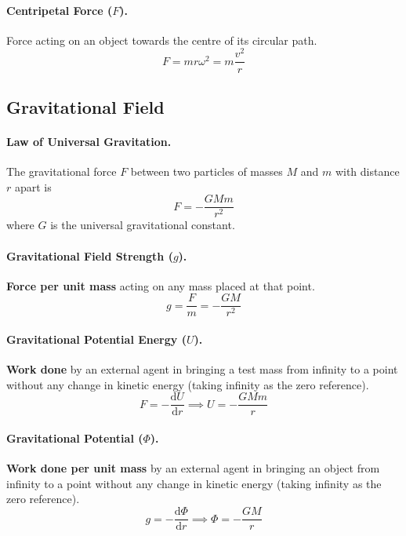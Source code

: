 \documentclass{article}
\begin{document}
\paragraph{Centripetal Force ($F$).} Force acting on an object towards the centre of its circular path. \begin{equation}
F = mr\omega^2 = m\frac{v^2}{r}
\end{equation}

\subsection{Gravitational Field}

\paragraph{Law of Universal Gravitation.} The gravitational force $F$ between two particles of masses $M$ and $m$ with distance $r$ apart is \begin{equation}
F = -\frac{GMm}{r^2}
\end{equation} where $G$ is the universal gravitational constant.

\paragraph{Gravitational Field Strength ($g$).} \textbf{Force per unit mass} acting on any mass placed at that point. \begin{equation}
g = \frac{F}{m} = -\frac{GM}{r^2}
\end{equation}

\paragraph{Gravitational Potential Energy ($U$).} \textbf{Work done} by an external agent in bringing a test mass from infinity to a point without any change in kinetic energy (taking infinity as the zero reference). \begin{equation}
F = -\frac{\mathrm{d}U}{\mathrm{d}r} \implies U = -\frac{GMm}{r}
\end{equation}

\paragraph{Gravitational Potential ($\Phi$).} \textbf{Work done per unit mass} by an external agent in bringing an object from infinity to a point without any change in kinetic energy (taking infinity as the zero reference). \begin{equation}
g = -\frac{\mathrm{d}\Phi}{\mathrm{d}r} \implies \Phi = -\frac{GM}{r}
\end{equation}
\end{document}
